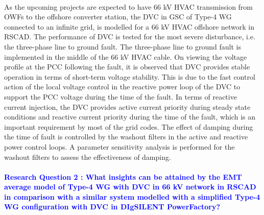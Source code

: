 \paragraph{} As the upcoming projects are expected to have 66 kV \gls{HVAC} transmission from \gls{OWF}s to the offshore converter station, the \gls{DVC} in \gls{GSC} of Type-4 \gls{WG} connected to an infinite grid, is modelled for a 66 kV \gls{HVAC} offshore network in RSCAD. The performance of \gls{DVC} is tested for the most severe disturbance, i.e. the three-phase line to ground fault. The three-phase line to ground fault is implemented in the middle of the 66 kV \gls{HVAC} cable. On viewing the voltage profile at the \gls{PCC} following the fault, it is observed that \gls{DVC} provides stable operation in terms of short-term voltage stability. This is due to the fast control action of the local voltage control in the reactive power loop of the \gls{DVC} to support the \gls{PCC} voltage during the time of the fault. 
In terms of reactive current injection, the \gls{DVC} provides active current priority during steady state conditions and reactive current priority during the time of the fault, which is an important requirement by most of the grid codes. The effect of damping during the time of fault is controlled by the washout filters in the active and reactive power control loops. A parameter sensitivity analysis is performed for the washout filters to assess the effectiveness of damping. %

\paragraph{\textcolor{blue}{Research Question 2 : What insights can be attained by the \gls{EMT} average model of Type-4 \gls{WG} with \gls{DVC} in 66 kV network in RSCAD in comparison with a similar system modelled with a simplified Type-4 \gls{WG} configuration with \gls{DVC} in DIgSILENT PowerFactory?}}

